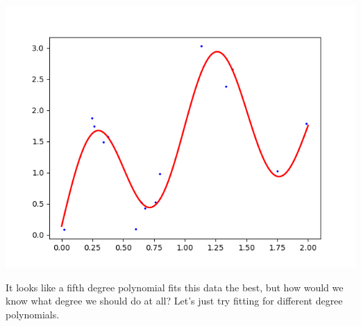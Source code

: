 \documentclass{article}
\theoremstyle{definition}
\begin{document}
      \begin{center}
        \includegraphics[scale=0.4]{img/True_data.png}
      \end{center}

      It looks like a fifth degree polynomial fits this data the best, but how would we know what degree we should do at all? Let's just try fitting for different degree polynomials. 
\end{document}
